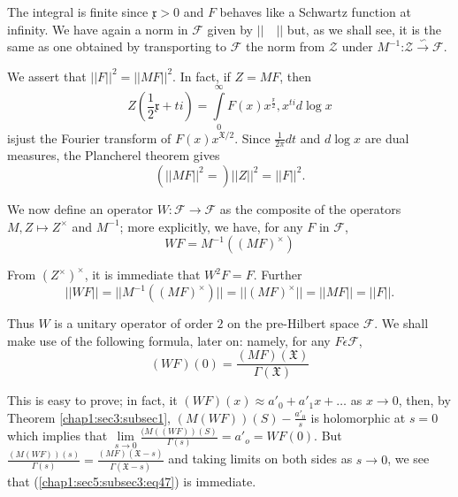 The integral is finite since $\mathfrak{x}>0$ and $F$ behaves like a
Schwartz function at infinity. We have again a norm in $\mathscr{F}$
given by $||\quad ||$ but, as we shall see, it is the same as one
obtained by transporting to $\mathscr{F}$ the  norm from $\mathscr{Z}$
under $M^{-1}$:$\mathscr{Z}\xrightarrow\backsim\mathscr{F}$.

We assert that $||F||^{2}=||MF||^{2}$. In fact, if $Z=MF$, then 
\begin{equation*}
  Z \left(\frac{1}{2}\mathfrak{x}+ti\right) =
  \int\limits_{0}^{\infty}F(x)x^{\frac{\mathfrak{x}}{2}},x^{ti}d\log x
\end{equation*}
is\pageoriginale just the Fourier transform of $F(x)x^{\mathfrak{X}/2}$. Since
$\frac{1}{2\pi}dt$ and $d \log x$ are dual measures, the Plancherel
theorem gives 
\begin{equation*}
  (||MF||^{2}=)||Z||^{2}=||F||^{2}. 
\end{equation*}

 We now define an operator $W:\mathscr{F}\rightarrow\mathscr{F}$ as
 the composite of the operators $M,Z\mapsto Z^\times $ and $M^{-1}$;
 more explicitly, we have, for any $F$ in $\mathscr{F}$, 
\begin{equation*}
  WF=M^{-1}((MF)^\times )\tag{46}\label{chap1:sec5:subsec3:eq46}
\end{equation*}

From $(Z^\times)^{\times}$, it is immediate that $W^{2}F=F$. Further
\begin{equation*}
  ||WF||=||M^{-1}((MF)^\times )||=||(MF)^\times ||=||MF||=||F||.
\end{equation*}

Thus $W$ is a unitary operator of order $2$ on the pre-Hilbert space
 $\mathscr{F}$. 
   We shall make use of the following formula, later on: namely, for
   any $F\epsilon \mathscr{F}$, 
   \begin{equation*}
     (WF)(0)=\frac{(MF)(\mathfrak{X})}{\Gamma(\mathfrak{X})}
     \tag{47}\label{chap1:sec5:subsec3:eq47}  
\end{equation*}

  This is easy to prove; in fact, it $(WF)(x)\approx
  a'_{0}+a'_{1}x+\ldots$ as $x\rightarrow 0$, then, by
  Theorem \ref{chap1:sec3:subsec1},
  $(M(WF))(S)-\frac{a'_{0}}{s}$ is holomorphic at $s=0$ which implies
  that $\lim\limits_{s\rightarrow
    0}\frac{(M((WF))(S)}{\Gamma(s)}=a'_{o}=WF(0)$. But
  $\frac{(M(WF))(s)}{\Gamma(s)}=\frac{(MF)(\mathfrak{X}-s)}{\Gamma
    (\mathfrak{X}-s)}$  
  and taking limits on both sides as $s\rightarrow 0$, we see that
  (\ref{chap1:sec5:subsec3:eq47}) is immediate. 

